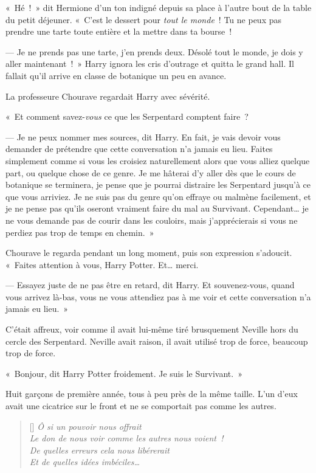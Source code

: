 \later

«~Hé~!~» dit Hermione d'un ton indigné depuis sa place à l'autre bout de la table du petit déjeuner.
«~C'est le dessert pour \emph{tout le monde}~!
Tu ne peux pas prendre une tarte toute entière et la mettre dans ta bourse~!

--- Je ne prends pas une tarte, j'en prends deux.
Désolé tout le monde, je dois y aller maintenant~!~»
Harry ignora les cris d'outrage et quitta le grand hall.
Il fallait qu'il arrive en classe de botanique un peu en avance.

\later

La professeure Chourave regardait Harry avec sévérité.

«~Et comment savez-\emph{vous} ce que les Serpentard comptent faire~?

--- Je ne peux nommer mes sources, dit Harry.
En fait, je vais devoir vous demander de prétendre que cette conversation n'a jamais eu lieu.
Faites simplement comme si vous les croisiez naturellement alors que vous alliez quelque part, ou quelque chose de ce genre.
Je me hâterai d'y aller dès que le cours de botanique se terminera, je pense que je pourrai distraire les Serpentard jusqu'à ce que vous arriviez.
Je ne suis pas du genre qu'on effraye ou malmène facilement, et je ne pense pas qu'ils oseront vraiment faire du mal au Survivant.
Cependant… je ne vous demande pas de courir dans les couloirs, mais j'apprécierais si vous ne perdiez pas trop de temps en chemin.~»

Chourave le regarda pendant un long moment, puis son expression s'adoucit.
«~Faites attention à vous, Harry Potter. Et… merci.

--- Essayez juste de ne pas être en retard, dit Harry.
Et souvenez-vous, quand vous arrivez là-bas, vous ne vous attendiez pas à me voir et cette conversation n'a jamais eu lieu.~»

\later

C'était affreux, voir comme il avait lui-même tiré brusquement Neville hors du cercle des Serpentard.
Neville avait raison, il avait utilisé trop de force, beaucoup trop de force.

«~Bonjour, dit Harry Potter froidement. Je suis le Survivant.~»

Huit garçons de première année, tous à peu près de la même taille.
L'un d'eux avait une cicatrice sur le front et ne se comportait pas comme les autres.

\baselineskip\settowidth{\versewidth}{Le don de nous voir comme les autres nous voient~!}
\begin{verse}[\versewidth]\itshape
Ô si un pouvoir nous offrait\\
Le don de nous voir comme les autres nous voient~!\\
De quelles erreurs cela nous libérerait\\
Et de quelles idées imbéciles…
\end{verse}

